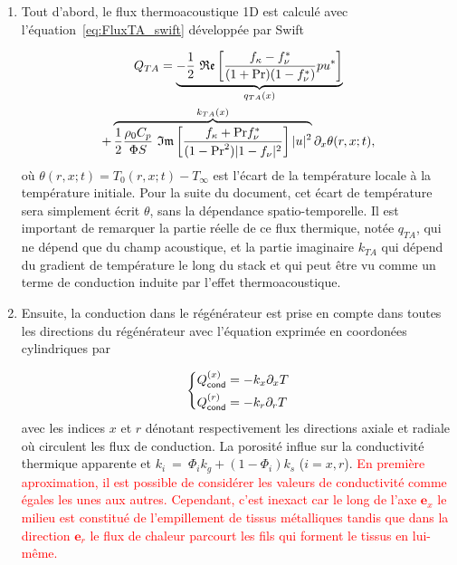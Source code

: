 \begin{enumerate}[label=\textbf{(\roman*)}]
\item Tout d'abord, le flux thermoacoustique 1D est calculé avec l'équation~\eqref{eq:FluxTA_swift} développée par Swift \cite{swift_thermoacoustics_2017}

\begin{multline}
	Q_{TA} = \underbrace{ -\frac12~\mathfrak{Re}\left[ \frac{ f_\kappa-f_\nu^* }{ (1+\mathrm{Pr})(1-f_\nu^*) } pu^* \right] }_{q_{TA}(x)} \\ 
	+ \overbrace{ \frac12 \frac{\rho_0 C_p}{\Phi S}~\mathfrak{Im}\left[ \frac{f_\kappa + \mathrm{Pr} f_\nu^*}{(1-\mathrm{Pr}^2)|1-f_\nu|^2} \right] |u|^2 }^{k_{TA}(x)}\partial_x \theta(r,x;t),
\label{eq:FluxTA_Lotton_Regen}
\end{multline}
où $\theta(r,x;t) = T_0(r,x;t)-T_\infty$ est l'écart de la température locale à la température initiale. Pour la suite du document, cet écart de température sera simplement écrit $\theta$, sans la dépendance spatio-temporelle. Il est important de remarquer la partie réelle de ce flux thermique, notée $q_{TA}$, qui ne dépend que du champ acoustique, et la partie imaginaire $k_{TA}$ qui dépend du gradient de température le long du stack et qui peut être vu comme un terme de conduction induite par l'effet thermoacoustique.

\item Ensuite, la conduction dans le régénérateur est prise en compte dans toutes les directions du régénérateur avec l'équation exprimée en coordonées cylindriques par


\begin{equation}
	\left\{ \begin{aligned}
		Q_{\sf cond}^{(x)} &= -k_x \partial_x T\\
		Q_{\sf cond}^{(r)} &= -k_r \partial_r T 
	\end{aligned}\right.
\end{equation}
avec les indices $x$ et $r$ dénotant respectivement les directions axiale et radiale où circulent les flux de conduction. La porosité influe sur la conductivité thermique apparente et $k_i~=~\Phi_i k_{g} + (1-\Phi_i)k_{s}$ ($i=x,r$). \textcolor{red}{En première aproximation, il est possible de considérer les valeurs de conductivité comme égales les unes aux autres. Cependant, c'est inexact car le long de l'axe $\mathbf e_x$ le milieu est constitué de l'empillement de tissus métalliques tandis que dans la direction $\mathbf e_r$ le flux de chaleur parcourt les fils qui forment le tissus en lui-même.}


\end{enumerate}
